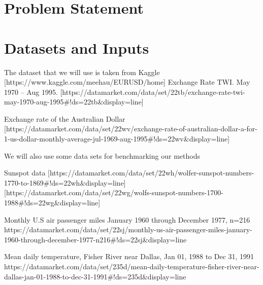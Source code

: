 \documentclass[10pt,a4paper]{article}
\begin{document}
\section{Problem Statement}





\section{Datasets and Inputs}


The dataset that we will use is taken from Kaggle [https://www.kaggle.com/meehau/EURUSD/home] 
Exchange Rate TWI. May 1970 – Aug 1995. [https://datamarket.com/data/set/22tb/exchange-rate-twi-may-1970-aug-1995#!ds=22tb&display=line]

Exchange rate of the Australian Dollar
[https://datamarket.com/data/set/22wv/exchange-rate-of-australian-dollar-a-for-1-us-dollar-monthly-average-jul-1969-aug-1995#!ds=22wv&display=line]

We will also use some data sets for benchmarking our methods

Sunspot data
[https://datamarket.com/data/set/22wh/wolfer-sunspot-numbers-1770-to-1869#!ds=22wh&display=line]
[https://datamarket.com/data/set/22wg/wolfs-sunspot-numbers-1700-1988#!ds=22wg&display=line]

Monthly U.S air passenger miles January 1960 through December 1977, n=216
https://datamarket.com/data/set/22sj/monthly-us-air-passenger-miles-january-1960-through-december-1977-n216#!ds=22sj&display=line

Mean daily temperature, Fisher River near Dallas, Jan 01, 1988 to Dec 31, 1991
https://datamarket.com/data/set/235d/mean-daily-temperature-fisher-river-near-dallas-jan-01-1988-to-dec-31-1991#!ds=235d&display=line
\end{document}
